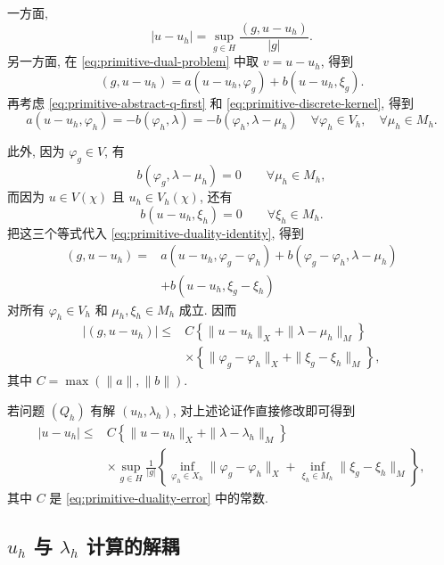 \begin{Proof}
一方面,
\[
|u-u_h|=\sup_{g\in H}\frac{(g,u-u_h)}{|g|}.
\]
另一方面, 在 \eqref{eq:primitive-dual-problem} 中取 $v=u-u_h$, 得到
\begin{equation}\label{eq:primitive-duality-identity}
(g,u-u_h)=a(u-u_h,\varphi_g)+b(u-u_h,\xi_g).
\end{equation}
再考虑 \eqref{eq:primitive-abstract-q-first} 和
\eqref{eq:primitive-discrete-kernel}, 得到
\[
a(u-u_h,\varphi_h)
=-b(\varphi_h,\lambda)
=-b(\varphi_h,\lambda-\mu_h)
\quad\forall\varphi_h\in V_h,\quad\forall\mu_h\in M_h.
\]

此外, 因为 $\varphi_g\in V$, 有
\[
b(\varphi_g,\lambda-\mu_h)=0
\qquad\forall\mu_h\in M_h,
\]
而因为 $u\in V(\chi)$ 且 $u_h\in V_h(\chi)$, 还有
\[
b(u-u_h,\xi_h)=0
\qquad\forall\xi_h\in M_h.
\]
把这三个等式代入 \eqref{eq:primitive-duality-identity}, 得到
\[
\begin{split}
(g,u-u_h)={}&a(u-u_h,\varphi_g-\varphi_h)
+b(\varphi_g-\varphi_h,\lambda-\mu_h)\\
&+b(u-u_h,\xi_g-\xi_h)
\end{split}
\]
对所有 $\varphi_h\in V_h$ 和 $\mu_h,\xi_h\in M_h$ 成立. 因而
\[
\begin{split}
|(g,u-u_h)|\leq{}&C
\left\{\|u-u_h\|_X+\|\lambda-\mu_h\|_M\right\}\\
&\times\left\{\|\varphi_g-\varphi_h\|_X
+\|\xi_g-\xi_h\|_M\right\},
\end{split}
\]
其中 $C=\max(\|a\|,\|b\|)$.
\end{Proof}

\setcounter{statement}{5}
\begin{Remark}\label{rem:primitive-duality-error-mixed-solution}
若问题 $(Q_h)$ 有解 $(u_h,\lambda_h)$, 对上述论证作直接修改即可得到
\[
\begin{split}
|u-u_h|\leq{}&C\left\{\|u-u_h\|_X+\|\lambda-\lambda_h\|_M\right\}\\
&\times\sup_{g\in H}\frac{1}{|g|}\left\{
\inf_{\varphi_h\in X_h}\|\varphi_g-\varphi_h\|_X
+\inf_{\xi_h\in M_h}\|\xi_g-\xi_h\|_M
\right\},
\end{split}
\]
其中 $C$ 是 \eqref{eq:primitive-duality-error} 中的常数.
\end{Remark}

\subsection{$u_h$ 与 $\lambda_h$ 计算的解耦}\label{subsec:primitive-decoupled-computation}


